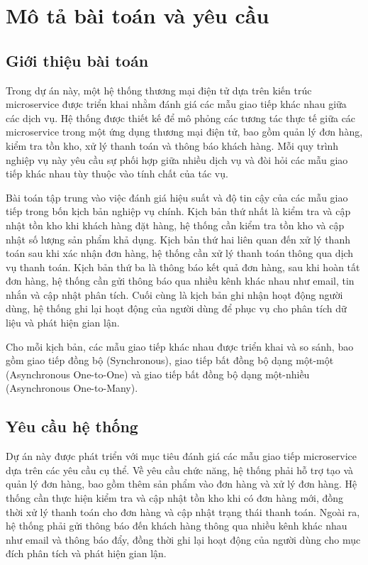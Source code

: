 \section{Mô tả bài toán và yêu cầu}

\subsection{Giới thiệu bài toán}
Trong dự án này, một hệ thống thương mại điện tử dựa trên kiến trúc microservice được triển khai nhằm đánh giá các mẫu giao tiếp khác nhau giữa các dịch vụ. Hệ thống được thiết kế để mô phỏng các tương tác thực tế giữa các microservice trong một ứng dụng thương mại điện tử, bao gồm quản lý đơn hàng, kiểm tra tồn kho, xử lý thanh toán và thông báo khách hàng. Mỗi quy trình nghiệp vụ này yêu cầu sự phối hợp giữa nhiều dịch vụ và đòi hỏi các mẫu giao tiếp khác nhau tùy thuộc vào tính chất của tác vụ.

Bài toán tập trung vào việc đánh giá hiệu suất và độ tin cậy của các mẫu giao tiếp trong bốn kịch bản nghiệp vụ chính. Kịch bản thứ nhất là kiểm tra và cập nhật tồn kho khi khách hàng đặt hàng, hệ thống cần kiểm tra tồn kho và cập nhật số lượng sản phẩm khả dụng. Kịch bản thứ hai liên quan đến xử lý thanh toán sau khi xác nhận đơn hàng, hệ thống cần xử lý thanh toán thông qua dịch vụ thanh toán. Kịch bản thứ ba là thông báo kết quả đơn hàng, sau khi hoàn tất đơn hàng, hệ thống cần gửi thông báo qua nhiều kênh khác nhau như email, tin nhắn và cập nhật phân tích. Cuối cùng là kịch bản ghi nhận hoạt động người dùng, hệ thống ghi lại hoạt động của người dùng để phục vụ cho phân tích dữ liệu và phát hiện gian lận.

Cho mỗi kịch bản, các mẫu giao tiếp khác nhau được triển khai và so sánh, bao gồm giao tiếp đồng bộ (Synchronous), giao tiếp bất đồng bộ dạng một-một (Asynchronous One-to-One) và giao tiếp bất đồng bộ dạng một-nhiều (Asynchronous One-to-Many).

\subsection{Yêu cầu hệ thống}
Dự án này được phát triển với mục tiêu đánh giá các mẫu giao tiếp microservice dựa trên các yêu cầu cụ thể. Về yêu cầu chức năng, hệ thống phải hỗ trợ tạo và quản lý đơn hàng, bao gồm thêm sản phẩm vào đơn hàng và xử lý đơn hàng. Hệ thống cần thực hiện kiểm tra và cập nhật tồn kho khi có đơn hàng mới, đồng thời xử lý thanh toán cho đơn hàng và cập nhật trạng thái thanh toán. Ngoài ra, hệ thống phải gửi thông báo đến khách hàng thông qua nhiều kênh khác nhau như email và thông báo đẩy, đồng thời ghi lại hoạt động của người dùng cho mục đích phân tích và phát hiện gian lận.

